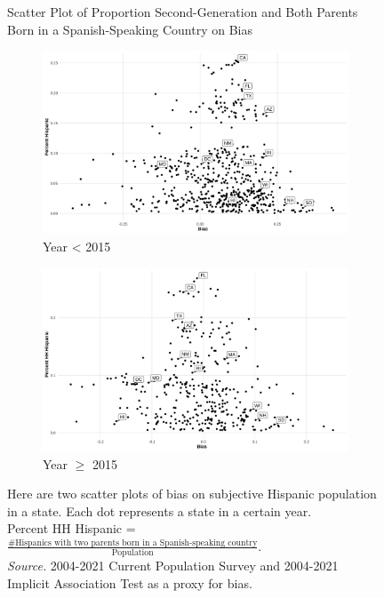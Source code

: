 \documentclass[12pt,english]{article}
\begin{document}
\begin{appendices}
\begin{figure}[!htb]
\centering
\caption{Scatter Plot of Proportion Second-Generation and Both Parents Born in a Spanish-Speaking Country on Bias}
\label{scatter-plot-4}
\begin{subfigure}{.9\textwidth}
\caption{Year < 2015}
\centering
\includegraphics[width=.9\linewidth]{figure/scatter-plot-bias-hh-hispanic-less2015-hh.png}
\end{subfigure}
\centering
\begin{subfigure}{.9\textwidth}
\caption{Year $\geq$ 2015}
\centering
\includegraphics[width=.9\linewidth]{figure/scatter-plot-bias-hh-hispanic-great2015-hh.png}
\end{subfigure}
\caption*{\footnotesize{Here are two scatter plots of bias on subjective Hispanic population in a state. Each dot represents a state in a certain year. \\ Percent HH Hispanic = $\frac{\# \text{Hispanics with two parents born in a Spanish-speaking country}}{\text{Population}}$. \\
\emph{Source.} 2004-2021 Current Population Survey and 2004-2021 Implicit Association Test as a proxy for bias.}}
\end{figure}


\end{appendices}
\end{document}
